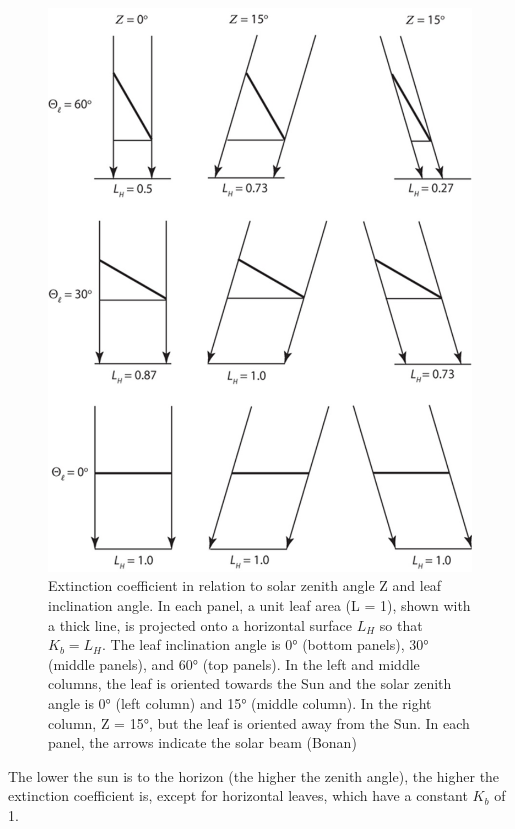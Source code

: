 \documentclass[12pt,oneside]{book}
\begin{document}
\begin{figure}

{\centering \includegraphics[width=0.8\linewidth]{figures/chap3/f311_LLh} 

}

\caption{Extinction coefficient in relation to solar zenith angle Ζ and leaf inclination angle. In each panel, a unit leaf area (L = 1), shown with a thick line, is projected onto a horizontal surface $L_H$ so that $K_b = L_H$. The leaf inclination angle is 0° (bottom panels), 30° (middle panels), and 60° (top panels). In the left and middle columns, the leaf is oriented towards the Sun and the solar zenith angle is 0° (left column) and 15° (middle column). In the right column, Ζ = 15°, but the leaf is oriented away from the Sun. In each panel, the arrows indicate the solar beam (Bonan)}\label{fig:f311}
\end{figure}

The lower the sun is to the horizon (the higher the zenith angle), the
higher the extinction coefficient is, except for horizontal leaves,
which have a constant \(K_b\) of 1.
\end{document}
